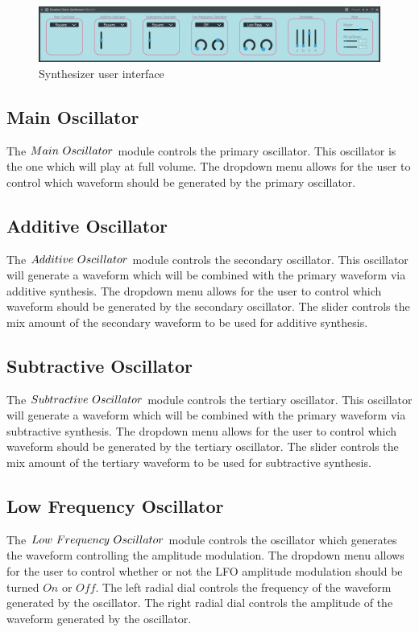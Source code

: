 \documentclass[a4paper,12pt]{report}
\begin{document}
\begin{figure} 
    \centering
    \includegraphics[width=36em]{OverallScreenshot.png}
    \caption{Synthesizer user interface}
    \label{fig:OverallScreenshot}
\end{figure}

\subsection{Main Oscillator}
\label{subsec:mainosc}
The $Main\ \-Oscillator$ module controls the primary oscillator. This oscillator is the one which will play at full volume. The dropdown menu allows for the user to control which waveform should be generated by the primary oscillator.


\subsection{Additive Oscillator}
\label{subsec:addosc}
The $Additive\ \-Oscillator$ module controls the secondary oscillator. This oscillator will generate a waveform which will be combined with the primary waveform via additive synthesis. The dropdown menu allows for the user to control which waveform should be generated by the secondary oscillator. The slider controls the mix amount of the secondary waveform to be used for additive synthesis.

\subsection{Subtractive Oscillator}
\label{subsec:subosc}
The $Subtractive\ \-Oscillator$ module controls the tertiary oscillator. This oscillator will generate a waveform which will be combined with the primary waveform via subtractive synthesis. The dropdown menu allows for the user to control which waveform should be generated by the tertiary oscillator. The slider controls the mix amount of the tertiary waveform to be used for subtractive synthesis.

\subsection{Low Frequency Oscillator}
\label{subsec:lfo}
The $Low\ \-Frequency\ \-Oscillator$ module controls the oscillator which generates the waveform controlling the amplitude modulation. The dropdown menu allows for the user to control whether or not the LFO amplitude modulation should be turned $On$ or $Off$. The left radial dial controls the frequency of the waveform generated by the oscillator. The right radial dial controls the amplitude of the waveform generated by the oscillator.
\end{document}
